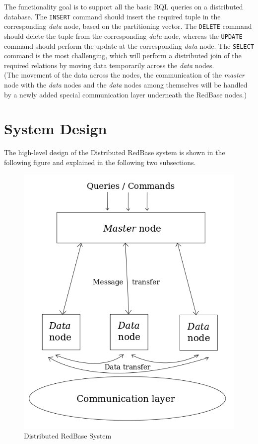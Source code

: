 \documentclass[letterpaper,11pt]{article}
\begin{document}
The functionality goal is to support all the basic RQL queries on a distributed database. The
\texttt{INSERT} command should insert the required tuple in the corresponding \textit{data} node,
based on the partitioning vector. The \texttt{DELETE} command should delete the tuple from the
corresponding \textit{data} node, whereas the \texttt{UPDATE} command should perform the update
at the corresponding \textit{data} node. The \texttt{SELECT} command is the most challenging,
which will perform a distributed join of the required relations by moving data temporarily across
the \textit{data} nodes.\\

(The movement of the data across the nodes, the communication of the \textit{master} node with
the \textit{data} nodes and the \textit{data} nodes among themselves will be handled by a
newly added special communication layer underneath the RedBase nodes.)


\section{System Design}
The high-level design of the Distributed RedBase system is shown in the following figure and
explained in the following two subsections.

\begin{figure}[h!]
\centering
\includegraphics[scale=0.4]{fig1}
\caption{Distributed RedBase System \label{fig:fig1}}
\end{figure}
\end{document}
